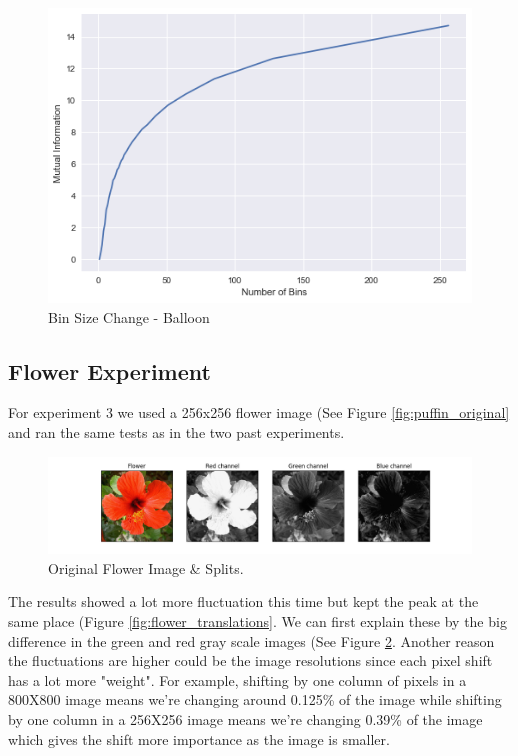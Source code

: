 \documentclass{article}
\begin{document}
\begin{figure}[H]
    \centering
    \includegraphics[width=\linewidth]{experiments/balloon/balloon-binSize.png}
    \caption{Bin Size Change - Balloon}
    \label{fig:balloon_binSize}
\end{figure}


\subsection{Flower Experiment}
\vspace{2mm}

\begin{flushleft}
For experiment 3 we used a 256x256 flower image (See Figure \ref{fig:puffin_original} and ran the same tests as in the two past experiments.
\end{flushleft}

\begin{figure}[H]
    \centering
    \includegraphics[width=12cm]{experiments/flower/RGB1-Flower.png}
    \caption{Original Flower Image \& Splits.}
    \label{fig:flower_original}
\end{figure}

\begin{flushleft}
The results showed a lot more fluctuation this time but kept the peak at the same place (Figure \ref{fig:flower_translations}. We can first explain these by the big difference in the green and red gray scale images (See Figure \ref{fig:flower_original}. 
Another reason the fluctuations are higher could be the image resolutions since each pixel shift has a lot more "weight". For example, shifting by one column of pixels in a 800X800 image means we're changing around 0.125\% of the image while shifting by one column in a 256X256 image means we're changing 0.39\% of the image which gives the shift more importance as the image is smaller.
\end{flushleft}
\end{document}
